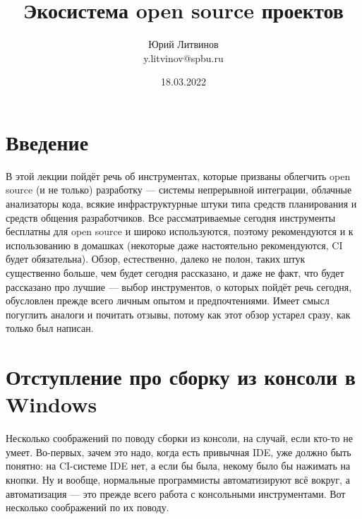 \documentclass[a5paper]{article}
\title{Экосистема open source проектов}
\author{Юрий Литвинов\\\small{y.litvinov@spbu.ru}}
\date{18.03.2022}
\begin{document}
\maketitle
\thispagestyle{empty}

\section{Введение}

В этой лекции пойдёт речь об инструментах, которые призваны облегчить open source (и не только) разработку --- системы непрерывной интеграции, облачные анализаторы кода, всякие инфраструктурные штуки типа средств планирования и средств общения разработчиков. Все рассматриваемые сегодня инструменты бесплатны для open source и широко используются, поэтому рекомендуются и к использованию в домашках (некоторые даже настоятельно рекомендуются, CI будет обязательна). Обзор, естественно, далеко не полон, таких штук существенно больше, чем будет сегодня рассказано, и даже не факт, что будет рассказано про лучшие --- выбор инструментов, о которых пойдёт речь сегодня, обусловлен прежде всего личным опытом и предпочтениями. Имеет смысл погуглить аналоги и почитать отзывы, потому как этот обзор устарел сразу, как только был написан.

\section{Отступление про сборку из консоли в Windows}

Несколько соображений по поводу сборки из консоли, на случай, если кто-то не умеет. Во-первых, зачем это надо, когда есть привычная IDE, уже должно быть понятно: на CI-системе IDE нет, а если бы была, некому было бы нажимать на кнопки. Ну и вообще, нормальные программисты автоматизируют всё вокруг, а автоматизация --- это прежде всего работа с консольными инструментами. Вот несколько соображений по их поводу.
\end{document}
